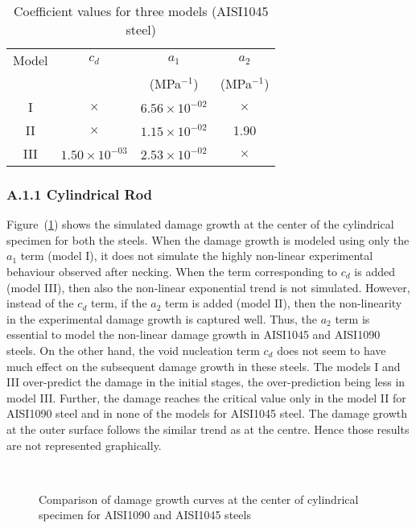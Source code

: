 \begin{table}[h]
\caption{Coefficient values for three models (AISI1045 steel)}
\begin{center}
\begin{tabular}{| c | c | c | c | }
\hline           Model & $c_{d}$  & $a_{1}$     & $a_{2}$   \\
                       &      &(MPa$^{-1}$) & (MPa$^{-1}$) \\
\hline
  I & $\times$ & $6.56\times10^{-02}$ & $\times$ \\
\hline
 II & $\times$ & $1.15\times10^{-02}$ & 1.90  \\
\hline
III &  $1.50\times10^{-03}$ & $2.53\times10^{-02}$ & $\times$ \\
\hline
\end{tabular}
\end{center}
\label{tab:chap8:coeff_value_diff_damage_laws_1045}
\end{table}
\subsubsection*{A.1.1 Cylindrical Rod}
Figure~(\ref{fig:chap8:damage_growth_cylinder_center_diff_coefficients}) shows the simulated damage growth at the
center of the cylindrical specimen for both the steels. When the damage growth is modeled using only the $a_{1}$ term (model I),
it does not simulate the highly non-linear experimental behaviour observed after necking. When
the term corresponding to $c_{d}$ is added (model III), then also the non-linear exponential trend
is not simulated. However, instead of the $c_{d}$ term, if the $a_{2}$ term is added (model II),
then the non-linearity in the experimental damage growth is captured well. Thus, the $a_{2}$
term is essential to model the non-linear damage growth in AISI1045 and AISI1090 steels. On the other
hand, the void nucleation term $c_{d}$ does not seem to have much effect on the subsequent damage
growth in these steels. The models I and III over-predict the damage in the initial stages, the
over-prediction being less in model III. Further, the damage reaches the critical value only
in the model II for AISI1090 steel and in none of the models for AISI1045 steel. The damage
growth at the outer surface follows the similar trend as at the centre. Hence those results
are not represented graphically.
\begin{figure}[ht]
\centering
{} \\
\caption{Comparison of damage growth curves at the center of cylindrical specimen for AISI1090 and AISI1045 steels} \label{fig:chap8:damage_growth_cylinder_center_diff_coefficients}
\end{figure}

